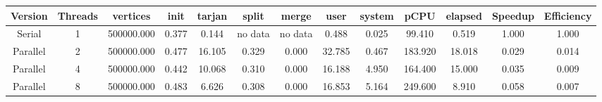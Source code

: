 \begin{tabular}{|c|c|c|c|c|c|c|c|c|c|c|c|c|}
\toprule
 Version &  Threads &   vertices &  init &  tarjan &   split &   merge &   user &  system &    pCPU &  elapsed &  Speedup &  Efficiency \\
\midrule
  Serial &        1 & 500000.000 & 0.377 &   0.144 & no data & no data &  0.488 &   0.025 &  99.410 &    0.519 &    1.000 &       1.000 \\
Parallel &        2 & 500000.000 & 0.477 &  16.105 &   0.329 &   0.000 & 32.785 &   0.467 & 183.920 &   18.018 &    0.029 &       0.014 \\
Parallel &        4 & 500000.000 & 0.442 &  10.068 &   0.310 &   0.000 & 16.188 &   4.950 & 164.400 &   15.000 &    0.035 &       0.009 \\
Parallel &        8 & 500000.000 & 0.483 &   6.626 &   0.308 &   0.000 & 16.853 &   5.164 & 249.600 &    8.910 &    0.058 &       0.007 \\
\bottomrule
\end{tabular}
